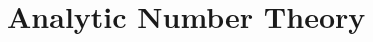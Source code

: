 \documentclass[main.tex]{subfiles}
\begin{document}
	\chapter{Analytic Number Theory}	

	
\end{document}
